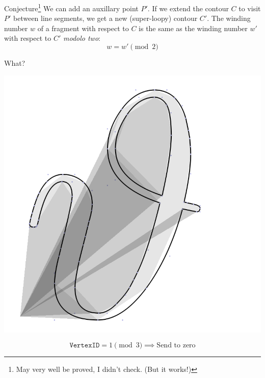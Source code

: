 \documentclass[14pt]{beamer}
\begin{document}
\begin{frame}
    \begin{block}{Conjecture\!\footnote[1]{May very well be proved, I didn't check. (But it works!)}}
        We can add an auxillary point $P'$.
        If we extend the contour $C$ to visit $P'$ between line segments, we get a
        new (super-loopy) contour $C'$.
        The winding number $w$ of a fragment with respect to $C$ is the same as the
        winding number $w'$ with respect to $C'$ \textit{modolo two}:
        \begin{equation}
            w = w' \pmod 2
        \end{equation}
    \end{block}
\end{frame}

\begin{frame}
    \centering
    What?

    \Huge {}
\end{frame}

\begin{frame}
    \centering
    \includegraphics[height=0.625\textheight]{demo/step1.png}


    $$
    \mathtt{VertexID} = 1 \pmod 3  \implies \text{Send to zero}
    $$
\end{frame}
\end{document}
